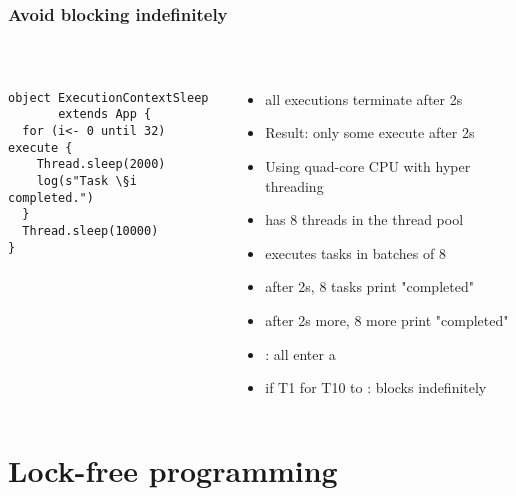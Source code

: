 \documentclass[aspectratio=169]{beamer}
\begin{document}
\begin{frame}[fragile]\frametitle{Avoid blocking indefinitely}
~\\[-8mm]
\begin{columns}
\begin{column}{0.45\textwidth}
\begin{lstlisting}[emph={execute,sleep,log,global}]
object ExecutionContextSleep
       extends App {
  for (i<- 0 until 32) execute {
    Thread.sleep(2000)
    log(s"Task \§i completed.")
  }
  Thread.sleep(10000)
}
\end{lstlisting}
\end{column}
\begin{column}{0.57\textwidth}
\begin{itemize}
  \item {} all executions terminate after 2s
  \item \alert{Result:} only some execute after 2s %
  \pause\\[4mm]
  \item Using quad-core CPU with hyper threading
  \item {} has 8 threads in the thread pool
  \pause\\[4mm]
  \item executes tasks in batches of 8
  \item after 2s, 8 tasks print "completed"
  \item after 2s more, 8 more print "completed"
  \item {}: all enter a 
  \pause\\[4mm]
  \item if T1  for T10 to : \alert{blocks indefinitely}
\end{itemize}
\end{column}
\end{columns}
\end{frame}



\section{Lock-free programming} %
\end{document}
